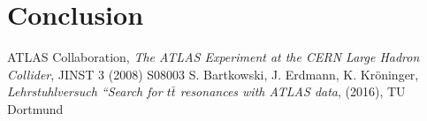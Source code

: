 \section{Conclusion}

 \begin{thebibliography}{WissOnl}
 	 ATLAS Collaboration, \textit{The ATLAS Experiment at the CERN Large Hadron Collider}, JINST 3 (2008) S08003
 	 S. Bartkowski, J. Erdmann, K. Kröninger, \textit{Lehrstuhlversuch ``Search for $t\bar t$ resonances with ATLAS data}, (2016), TU Dortmund
 \end{thebibliography}




